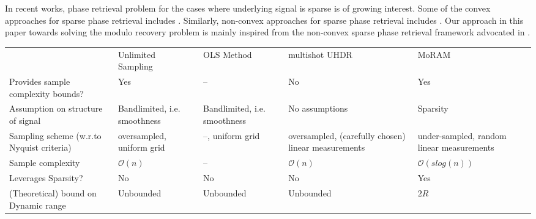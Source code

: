 In recent works, phase retrieval problem for the cases where underlying signal is sparse is of growing interest. Some of the convex approaches for sparse phase retrieval includes \cite{ohlsson2012cprl, li2013sparse,bahmani2015efficient,jaganathan2012recovery}. Similarly, non-convex approaches for sparse phase retrieval includes \cite{netrapalli2013phase, cai2016optimal, wang2016sparse}. Our approach in this paper towards solving the modulo recovery problem is mainly inspired from the non-convex sparse phase retrieval framework advocated in \cite{Jagatap2017}. 



\begin{table*}[t]
	\centering
	\begin{tabular}{|p{3cm}|p{3cm}|p{2.5cm}|p{3cm}|p{3cm}|}
		\cline{1-5}
		& Unlimited Sampling~\cite{Bhandari}  & OLS Method~\cite{Cucuringu2018} & multishot UHDR~\cite{ICCP15_Zhao}  & MoRAM \\ \cline{1-5}

		Provides sample complexity bounds?  & Yes  & --  & No & Yes \\ \cline{1-5}
		Assumption on structure of signal  & Bandlimited, i.e. smoothness   & Bandlimited, i.e. smoothness &  No assumptions & Sparsity     \\ \cline{1-5}
		Sampling scheme (w.r.to Nyquist criteria)  & oversampled, uniform grid &  --, uniform grid  &  oversampled, (carefully chosen) linear measurements   & under-sampled,
		random linear measurements \\ \cline{1-5}
		Sample complexity  & $ \mathcal{O}(n)$    & --    & $\mathcal{O}(n)$   & $\mathcal{O}(slog(n))$ \\ \cline{1-5}
		Leverages Sparsity?  & No & No   & No    & Yes \\ \cline{1-5}
		(Theoretical) bound on Dynamic range    & Unbounded   & Unbounded     & Unbounded   & $2R$  \\ \cline{1-5}                 
	\end{tabular}
\end{table*}

